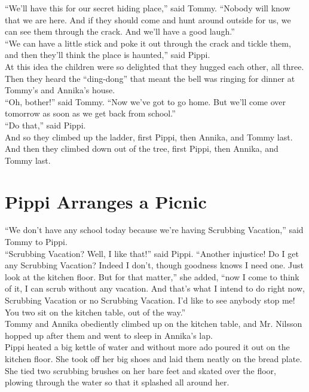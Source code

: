 \documentclass{standard}
\begin{document}
“We’ll have this for our secret hiding place,” said Tommy. “Nobody will know that we are here. And if they should come and hunt around outside for us, we can see them through the crack. And we’ll have a good laugh.”\\

“We can have a little stick and poke it out through the crack and tickle them, and then they’ll think the place is haunted,” said Pippi.\\

At this idea the children were so delighted that they hugged each other, all three. Then they heard the “ding-dong” that meant the bell was ringing for dinner at Tommy’s and Annika’s house.\\

“Oh, bother!” said Tommy. “Now we’ve got to go home. But we’ll come over tomorrow as soon as we get back from school.”\\

“Do that,” said Pippi.\\

And so they climbed up the ladder, first Pippi, then Annika, and Tommy last. And then they climbed down out of the tree, first Pippi, then Annika, and Tommy last.\\
\newpage



\section{Pippi Arranges a Picnic}
“We don’t have any school today because we’re having Scrubbing Vacation,” said Tommy to Pippi.\\

“Scrubbing Vacation? Well, I like that!” said Pippi. “Another injustice! Do I get any Scrubbing Vacation? Indeed I don’t, though goodness knows I need one. Just look at the kitchen floor. But for that matter,” she added, “now I come to think of it, I can scrub without any vacation. And that’s what I intend to do right now, Scrubbing Vacation or no Scrubbing Vacation. I’d like to see anybody stop me! You two sit on the kitchen table, out of the way.”\\

Tommy and Annika obediently climbed up on the kitchen table, and Mr. Nilsson hopped up after them and went to sleep in Annika’s lap.\\

Pippi heated a big kettle of water and without more ado poured it out on the kitchen floor. She took off her big shoes and laid them neatly on the bread plate. She tied two scrubbing brushes on her bare feet and skated over the floor, plowing through the water so that it splashed all around her.\\
\end{document}
